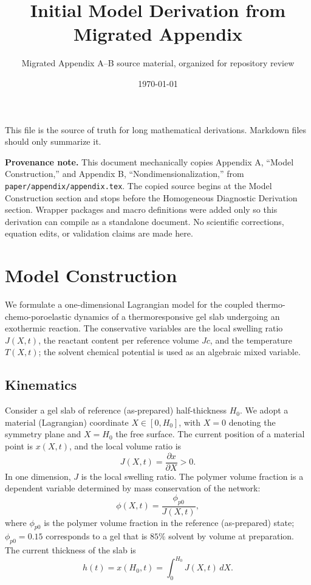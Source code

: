 \documentclass[11pt]{article}
\title{Initial Model Derivation from Migrated Appendix}
\author{Migrated Appendix A--B source material, organized for repository review}
\date{\today}
\newcommand{\pp}{\phi_{p0}}
\begin{document}
\maketitle

\noindent This file is the source of truth for long mathematical derivations. Markdown files should only summarize it.

\medskip
\noindent\textbf{Provenance note.}
This document mechanically copies Appendix A, ``Model Construction,'' and Appendix B, ``Nondimensionalization,'' from \texttt{paper/appendix/appendix.tex}. The copied source begins at the Model Construction section and stops before the Homogeneous Diagnostic Derivation section. Wrapper packages and macro definitions were added only so this derivation can compile as a standalone document. No scientific corrections, equation edits, or validation claims are made here.

\section{Model Construction}
\label{app:model}

We formulate a one-dimensional Lagrangian model for the coupled thermo-chemo-poroelastic dynamics of a thermoresponsive gel slab undergoing an exothermic reaction. The conservative variables are the local swelling ratio $J(X,t)$, the reactant content per reference volume $Jc$, and the temperature $T(X,t)$; the solvent chemical potential is used as an algebraic mixed variable.

\subsection{Kinematics}

Consider a gel slab of reference (as-prepared) half-thickness $H_0$. We adopt a material (Lagrangian) coordinate $X\in[0,H_0]$, with $X=0$ denoting the symmetry plane and $X=H_0$ the free surface. The current position of a material point is $x(X,t)$, and the local volume ratio is
\begin{equation}
  J(X,t) = \frac{\partial x}{\partial X} > 0.
  \label{eq:J_def}
\end{equation}
In one dimension, $J$ is the local swelling ratio. The polymer volume fraction is a dependent variable determined by mass conservation of the network:
\begin{equation}
  \phi(X,t) = \frac{\pp}{J(X,t)},
  \label{eq:phi_J}
\end{equation}
where $\pp$ is the polymer volume fraction in the reference (as-prepared) state; $\pp=0.15$ corresponds to a gel that is $85\%$ solvent by volume at preparation. The current thickness of the slab is
\begin{equation}
  h(t) = x(H_0,t) = \int_0^{H_0} J(X,t)\,dX.
  \label{eq:thickness}
\end{equation}
\end{document}
